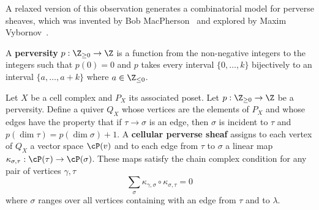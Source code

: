 A relaxed version of this observation generates a combinatorial model for perverse sheaves, which was invented by Bob MacPherson~\cite{gmv} and explored by Maxim Vybornov~\cite{vybornov-mqa,vybornov-constr}.

\begin{defn}
A \textbf{perversity} $p:\Z_{\geq 0} \to \Z$ is a function from the non-negative integers to the integers such that $p(0)=0$ and $p$ takes every interval $\{0,\ldots,k\}$ bijectively to an interval $\{a,\ldots,a+k\}$ where $a\in\Z_{\leq 0}$.
\end{defn}

\begin{defn}\label{defn:cellular_perverse_sheaves}
Let $X$ be a cell complex and $P_X$ its associated poset. Let $p:\Z_{\geq 0}\to\Z$ be a perversity. Define a quiver $Q_X$ whose vertices are the elements of $P_X$ and whose edges have the property that if $\tau\to\sigma$ is an edge, then $\sigma$ is incident to $\tau$ and $p(\dim\tau)=p(\dim\sigma)+1$. A \textbf{cellular perverse sheaf} assigns to each vertex of $Q_X$ a vector space $\cP(v)$ and to each edge from $\tau$ to $\sigma$ a linear map $\kappa_{\sigma,\tau}:\cP(\tau)\to\cP(\sigma)$. These maps satisfy the chain complex condition for any pair of vertices $\gamma,\tau$
\[
\sum_{\sigma} \kappa_{\gamma,\sigma}\circ \kappa_{\sigma,\tau}=0
\]
where $\sigma$ ranges over all vertices containing with an edge from $\tau$ and to $\lambda$.
\end{defn}
